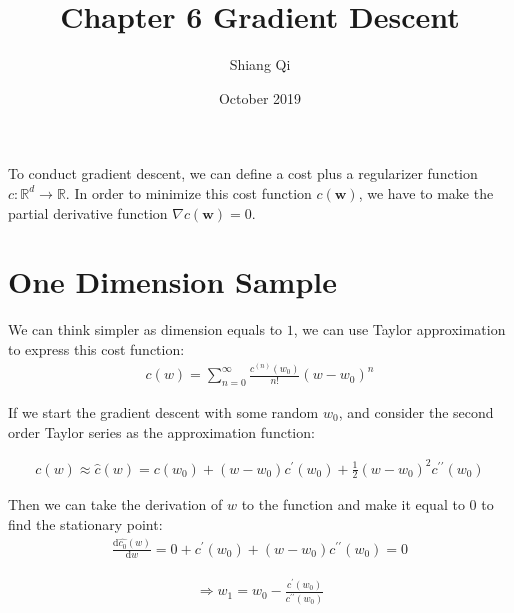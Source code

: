 \documentclass{article}
\title{Chapter 6 Gradient Descent}
\author{Shiang Qi}
\date{October 2019}
\begin{document}
\maketitle

To conduct gradient descent, we can define a cost plus a regularizer function $c:\mathbb{R}^{d} \xrightarrow{} \mathbb{R}$. In order to minimize this cost function $c(\mathbf{w})$, we have to make the partial derivative function  $\nabla c(\mathbf{w}) = 0$. 

\section{One Dimension Sample}


We can think simpler as dimension equals to $1$, we can use Taylor approximation to express this cost function:
\begin{equation}
    \begin{aligned}
        c(w) = \sum_{n=0}^{\infty} \frac{c^{(n)}(w_0)}{n!}(w-w_0)^{n}
    \end{aligned}
\end{equation}

If we start the gradient descent with some random $w_0$, and consider the second order Taylor series as the approximation function:

\begin{equation}\label{2order function}
    \begin{aligned}
        c(w) \approx \hat{c}(w) = c(w_0) + (w-w_0)c^{\prime}(w_0) + \frac{1}{2} (w-w_0)^{2}c^{\prime \prime}(w_0)
    \end{aligned}
\end{equation}

Then we can take the derivation of $w$ to the function and make it equal to 0 to find the stationary point:
\begin{equation}
    \begin{aligned}
        \frac{\mathrm{d}\hat{c_0}(w)}{\mathrm{d}w} = 0 + c^{\prime}(w_0) + (w-w_0)c^{\prime \prime}(w_0) = 0
    \end{aligned}
\end{equation}


\begin{equation}\label{2order update}
    \begin{aligned}
        \Rightarrow w_1 = w_0 - \frac{c^{\prime}(w_0)}{c^{\prime \prime}(w_0)}
    \end{aligned}
\end{equation}
\end{document}
